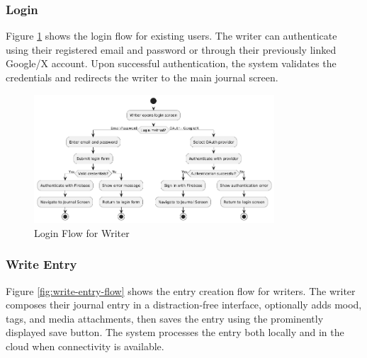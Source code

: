 \subsubsection{Login}\label{subsubsec:login}

Figure \ref{fig:login-flow} shows the login flow for existing users. The writer can authenticate using their registered email and password or through their previously linked Google/X account. Upon successful authentication, the system validates the credentials and redirects the writer to the main journal screen.

\begin{figure}[H]
\centering
\includegraphics[width=0.8\textwidth]{files/imgs/login_flow.png}
\caption{Login Flow for Writer}
\label{fig:login-flow}
\end{figure}

\subsubsection{Write Entry}\label{subsubsec:writeEntry}

Figure \ref{fig:write-entry-flow} shows the entry creation flow for writers. The writer composes their journal entry in a distraction-free interface, optionally adds mood, tags, and media attachments, then saves the entry using the prominently displayed save button. The system processes the entry both locally and in the cloud when connectivity is available.

